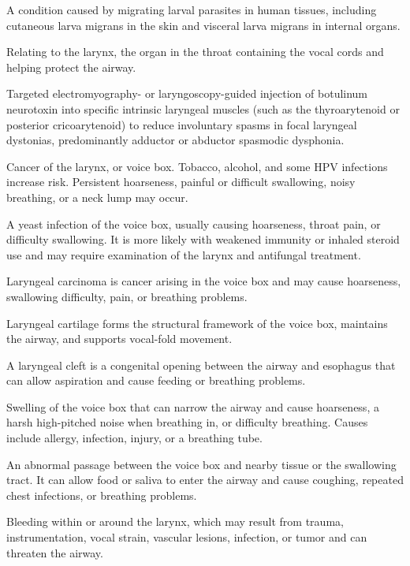  A condition caused by migrating larval parasites in human tissues, including cutaneous larva migrans in the skin and visceral larva migrans in internal organs.

 Relating to the larynx, the organ in the throat containing the vocal cords and helping protect the airway.

 Targeted electromyography- or laryngoscopy-guided injection of botulinum neurotoxin into specific intrinsic laryngeal muscles (such as the thyroarytenoid or posterior cricoarytenoid) to reduce involuntary spasms in focal laryngeal dystonias, predominantly adductor or abductor spasmodic dysphonia.

 Cancer of the larynx, or voice box. Tobacco, alcohol, and some HPV infections increase risk. Persistent hoarseness, painful or difficult swallowing, noisy breathing, or a neck lump may occur.

 A yeast infection of the voice box, usually causing hoarseness, throat pain, or difficulty swallowing. It is more likely with weakened immunity or inhaled steroid use and may require examination of the larynx and antifungal treatment.

 Laryngeal carcinoma is cancer arising in the voice box and may cause hoarseness, swallowing difficulty, pain, or breathing problems.

 Laryngeal cartilage forms the structural framework of the voice box, maintains the airway, and supports vocal-fold movement.

 A laryngeal cleft is a congenital opening between the airway and esophagus that can allow aspiration and cause feeding or breathing problems.

 Swelling of the voice box that can narrow the airway and cause hoarseness, a harsh high-pitched noise when breathing in, or difficulty breathing. Causes include allergy, infection, injury, or a breathing tube.

 An abnormal passage between the voice box and nearby tissue or the swallowing tract. It can allow food or saliva to enter the airway and cause coughing, repeated chest infections, or breathing problems.

 Bleeding within or around the larynx, which may result from trauma, instrumentation, vocal strain, vascular lesions, infection, or tumor and can threaten the airway.

